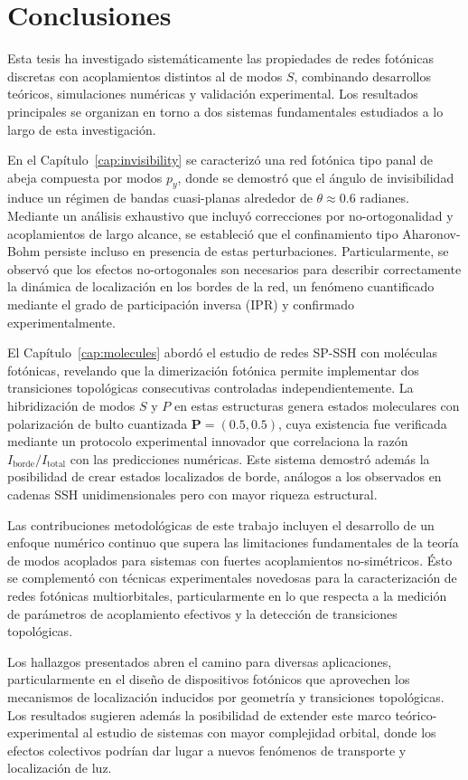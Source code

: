\chapter{Conclusiones}

Esta tesis ha investigado sistemáticamente las propiedades de redes fotónicas discretas con acoplamientos distintos al de modos $S$, combinando desarrollos teóricos, simulaciones numéricas y validación experimental. Los resultados principales se organizan en torno a dos sistemas fundamentales estudiados a lo largo de esta investigación.

En el Capítulo~\ref{cap:invisibility} se caracterizó una red fotónica tipo panal de abeja compuesta por modos $p_y$, donde se demostró que el ángulo de invisibilidad induce un régimen de bandas cuasi-planas alrededor de $\theta \approx 0.6$ radianes. Mediante un análisis exhaustivo que incluyó correcciones por no-ortogonalidad y acoplamientos de largo alcance, se estableció que el confinamiento tipo Aharonov-Bohm persiste incluso en presencia de estas perturbaciones. Particularmente, se observó que los efectos no-ortogonales son necesarios para describir correctamente la dinámica de localización en los bordes de la red, un fenómeno cuantificado mediante el grado de participación inversa (IPR) y confirmado experimentalmente.

El Capítulo~\ref{cap:molecules} abordó el estudio de redes SP-SSH con moléculas fotónicas, revelando que la dimerización fotónica permite implementar dos transiciones topológicas consecutivas controladas independientemente. La hibridización de modos $S$ y $P$ en estas estructuras genera estados moleculares con polarización de bulto cuantizada $\mathbf{P} = (0.5, 0.5)$, cuya existencia fue verificada mediante un protocolo experimental innovador que correlaciona la razón $I_{\text{borde}}/I_{\text{total}}$ con las predicciones numéricas. Este sistema demostró además la posibilidad de crear estados localizados de borde, análogos a los observados en cadenas SSH unidimensionales pero con mayor riqueza estructural.

Las contribuciones metodológicas de este trabajo incluyen el desarrollo de un enfoque numérico continuo que supera las limitaciones fundamentales de la teoría de modos acoplados para sistemas con fuertes acoplamientos no-simétricos. Ésto se complementó con técnicas experimentales novedosas para la caracterización de redes fotónicas multiorbitales, particularmente en lo que respecta a la medición de parámetros de acoplamiento efectivos y la detección de transiciones topológicas.

Los hallazgos presentados abren el camino para diversas aplicaciones, particularmente en el diseño de dispositivos fotónicos que aprovechen los mecanismos de localización inducidos por geometría y transiciones topológicas. Los resultados sugieren además la posibilidad de extender este marco teórico-experimental al estudio de sistemas con mayor complejidad orbital, donde los efectos colectivos podrían dar lugar a nuevos fenómenos de transporte y localización de luz.
